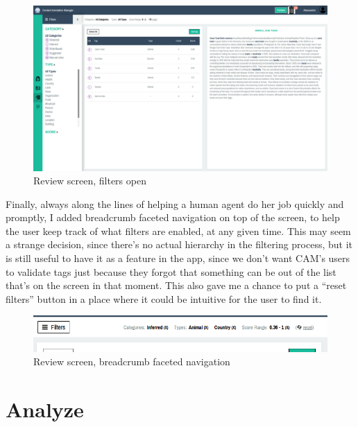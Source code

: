 \documentclass[12pt,svgnames]{memoir}
\begin{document}
\begin{figure}[htbp]
\centering
\includegraphics{./src/img/review-open.png}
\caption{Review screen, filters open}
\end{figure}

Finally, always along the lines of helping a human agent do her job
quickly and promptly, I added breadcrumb faceted navigation on top of
the screen, to help the user keep track of what filters are enabled, at
any given time. This may seem a strange decision, since there's no
actual hierarchy in the filtering process, but it is still useful to
have it as a feature in the app, since we don't want CAM's users to
validate tags just because they forgot that something can be out of the
list that's on the screen in that moment. This also gave me a chance to
put a ``reset filters'' button in a place where it could be intuitive
for the user to find it.

\begin{figure}[htbp]
\centering
\includegraphics{./src/img/review-breadcrumb.png}
\caption{Review screen, breadcrumb faceted navigation}
\end{figure}

\section{Analyze}\label{analyze}
\end{document}
